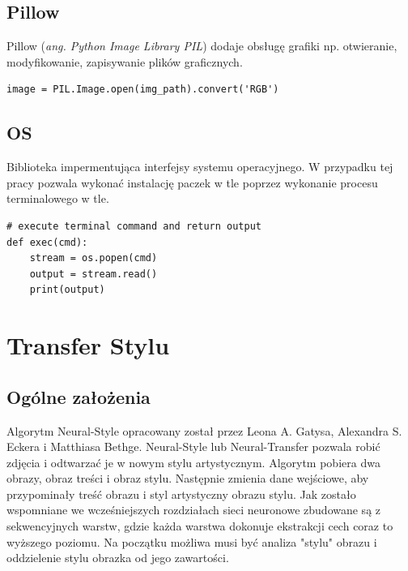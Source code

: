 \documentclass[openright]{xmgr}
\begin{document}
\section{Pillow\label{s:dsssl}}
    
  \indent \indent  Pillow (\textit{ang. Python Image Library PIL}) dodaje obsługę grafiki np. otwieranie, modyfikowanie, zapisywanie plików graficznych.
   
\begin{lstlisting}
image = PIL.Image.open(img_path).convert('RGB')
\end{lstlisting}
   
    
\section{OS\label{s:dsssl}}
        
  \indent \indent Biblioteka impermentująca interfejsy systemu operacyjnego. W przypadku tej pracy pozwala wykonać instalację paczek w tle poprzez wykonanie procesu terminalowego w tle. 


\begin{lstlisting}
# execute terminal command and return output
def exec(cmd):
    stream = os.popen(cmd)
    output = stream.read()
    print(output)
\end{lstlisting}



\chapter{Transfer Stylu }

\section{Ogólne założenia\label{s:dsssl}}

  \indent \indent Algorytm Neural-Style opracowany został przez Leona A. Gatysa, Alexandra S. Eckera i Matthiasa Bethge. Neural-Style lub Neural-Transfer pozwala robić zdjęcia i odtwarzać je w nowym stylu artystycznym. Algorytm pobiera dwa obrazy, obraz treści i obraz stylu. Następnie zmienia dane wejściowe, aby przypominały treść obrazu i styl artystyczny obrazu stylu. Jak zostało wspomniane we wcześniejszych rozdziałach sieci neuronowe zbudowane są z sekwencyjnych warstw, gdzie każda warstwa dokonuje ekstrakcji cech coraz to wyższego poziomu. Na początku możliwa musi być analiza "stylu" obrazu i oddzielenie stylu obrazka od jego zawartości. 
  
\end{document}
